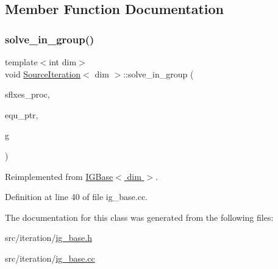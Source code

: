 \subsection{Member Function Documentation}
\mbox{\label{class_source_iteration_a6d726b9a581391cc4164c29f4ccd1ca5}} 
\subsubsection{\texorpdfstring{solve\+\_\+in\+\_\+group()}{solve\_in\_group()}}
{\footnotesize\ttfamily template$<$int dim$>$ \\
void \hyperlink{class_source_iteration}{Source\+Iteration}$<$ dim $>$\+::solve\+\_\+in\+\_\+group (\begin{DoxyParamCaption}\item[{std\+::vector$<$ Vector$<$ double $>$ $>$ \&}]{sflxes\+\_\+proc,  }\item[{std\+\_\+cxx11\+::shared\+\_\+ptr$<$ \hyperlink{class_equation_base}{Equation\+Base}$<$ dim $>$ $>$}]{equ\+\_\+ptr,  }\item[{unsigned int \&}]{g }\end{DoxyParamCaption})\hspace{0.3cm}{\ttfamily [virtual]}}



Reimplemented from \hyperlink{class_i_g_base_abd1edeb3ca2076fcb087abc658a09f30}{I\+G\+Base$<$ dim $>$}.



Definition at line 40 of file ig\+\_\+base.\+cc.



The documentation for this class was generated from the following files\+:\begin{DoxyCompactItemize}
\item 
src/iteration/\hyperlink{ig__base_8h}{ig\+\_\+base.\+h}\item 
src/iteration/\hyperlink{ig__base_8cc}{ig\+\_\+base.\+cc}\end{DoxyCompactItemize}
